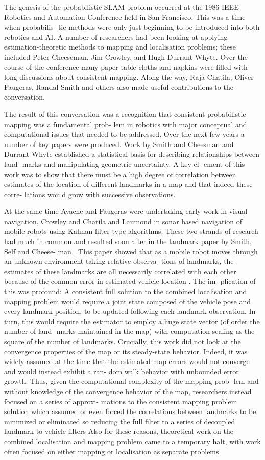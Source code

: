 \documentclass[12pt]{article}
\begin{document}
The genesis of the probabilistic SLAM problem occurred
at the 1986 IEEE Robotics and Automation Conference held in San Francisco. This was a time when probabilis- tic methods were only just beginning to be introduced into both robotics and AI. A number of researchers had been looking at applying estimation-theoretic methods to mapping and localisation problems; these included Peter Cheeseman, Jim Crowley, and Hugh Durrant-Whyte. Over the course of the conference many paper table cloths and napkins were filled with long discussions about consistent mapping. Along the way, Raja Chatila, Oliver Faugeras, Randal Smith and others also made useful contributions to the conversation.
\par The result of this conversation was a recognition that consistent probabilistic mapping was a fundamental prob- lem in robotics with major conceptual and computational issues that needed to be addressed. Over the next few years a number of key papers were produced. Work by Smith and Cheesman  and Durrant-Whyte  established a statistical basis for describing relationships between land- marks and manipulating geometric uncertainty. A key el- ement of this work was to show that there must be a high degree of correlation between estimates of the location of different landmarks in a map and that indeed these corre- lations would grow with successive observations.
\par At the same time Ayache and Faugeras  were undertaking early work in visual navigation, Crowley  and Chatila and Laumond  in sonar based navigation of mobile robots using Kalman filter-type algorithms. These two strands of research had much in common and resulted soon after in the landmark paper by Smith, Self and Cheese- man . This paper showed that as a mobile robot moves through an unknown environment taking relative observa- tions of landmarks, the estimates of these landmarks are all necessarily correlated with each other because of the common error in estimated vehicle location . The im- plication of this was profound: A consistent full solution to the combined localisation and mapping problem would require a joint state composed of the vehicle pose and every landmark position, to be updated following each landmark observation. In turn, this would require the estimator to employ a huge state vector (of order the number of land- marks maintained in the map) with computation scaling as the square of the number of landmarks.
 Crucially, this work did not look at the convergence properties of the map or its steady-state behavior. Indeed, it was widely assumed at the time that the estimated map errors would not converge and would instead exhibit a ran- dom walk behavior with unbounded error growth. Thus, given the computational complexity of the mapping prob- lem and without knowledge of the convergence behavior of the map, researchers instead focused on a series of approxi- mations to the consistent mapping problem solution which assumed or even forced the correlations between landmarks to be minimized or eliminated so reducing the full filter to a series of decoupled landmark to vehicle filters Also for these reasons, theoretical work on the combined localisation and mapping problem came to a temporary halt, with work often focused on either mapping or localisation as separate problems.
\end{document}
